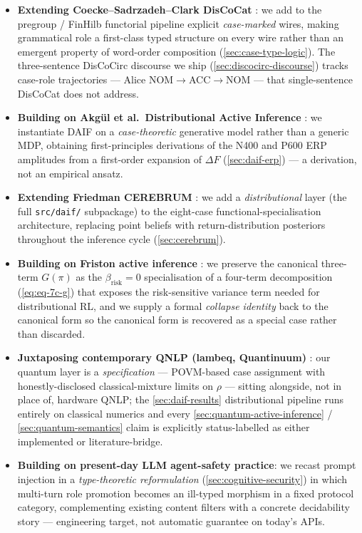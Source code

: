 \documentclass[
]{article}
\begin{document}
\begin{itemize}
\item
  \textbf{Extending Coecke--Sadrzadeh--Clark DisCoCat}
  \citetext{\citeyear{coecke2010mathematical}; \citeyear{coeckekissinger2017}}:
  we add to the pregroup / FinHilb functorial pipeline explicit
  \emph{case-marked} wires, making grammatical role a first-class typed
  structure on every wire rather than an emergent property of word-order
  composition (\autoref{sec:case-type-logic}). The three-sentence
  DisCoCirc discourse we ship (\autoref{sec:discocirc-discourse}) tracks
  case-role trajectories --- Alice NOM\texorpdfstring{\ensuremath{\to}}{->}ACC\texorpdfstring{\ensuremath{\to}}{->}NOM --- that single-sentence
  DisCoCat does not address.
\item
  \textbf{Building on Akgül et al.~Distributional Active Inference}
  \citeyearpar{akgul2026distributional}: we instantiate DAIF on a
  \emph{case-theoretic} generative model rather than a generic MDP,
  obtaining first-principles derivations of the N400 and P600 ERP
  amplitudes from a first-order expansion of \(\Delta F\)
  (\autoref{sec:daif-erp}) --- a derivation, not an empirical ansatz.
\item
  \textbf{Extending Friedman CEREBRUM}
  \citeyearpar{friedman2024cerebrum}: we add a \emph{distributional}
  layer (the full \texttt{src/daif/} subpackage) to the eight-case
  functional-specialisation architecture, replacing point beliefs with
  return-distribution posteriors throughout the inference cycle
  (\autoref{sec:cerebrum}).
\item
  \textbf{Building on Friston active inference}
  \citeyearpar{friston2017active}: we preserve the canonical three-term
  \(G(\pi)\) as the \(\beta_{\text{risk}} = 0\) specialisation of a
  four-term decomposition (\autoref{eq:eq-7c-g}) that exposes the
  risk-sensitive variance term needed for distributional RL, and we
  supply a formal \emph{collapse identity} back to the canonical form so
  the canonical form is recovered as a special case rather than
  discarded.
\item
  \textbf{Juxtaposing contemporary QNLP (lambeq, Quantinuum)}
  \citeyearpar{lorenz2021lambeq}: our quantum layer is a
  \emph{specification} --- POVM-based case assignment with
  honestly-disclosed classical-mixture limits on \(\rho\) --- sitting
  alongside, not in place of, hardware QNLP; the
  \autoref{sec:daif-results} distributional pipeline runs entirely on
  classical numerics and every \autoref{sec:quantum-active-inference} /
  \autoref{sec:quantum-semantics} claim is explicitly status-labelled as
  either implemented or literature-bridge.
\item
  \textbf{Building on present-day LLM agent-safety practice}: we recast
  prompt injection in a \emph{type-theoretic reformulation}
  (\autoref{sec:cognitive-security}) in which multi-turn role promotion
  becomes an ill-typed morphism in a fixed protocol category,
  complementing existing content filters with a concrete decidability
  story --- engineering target, not automatic guarantee on today's APIs.
\end{itemize}
\end{document}
